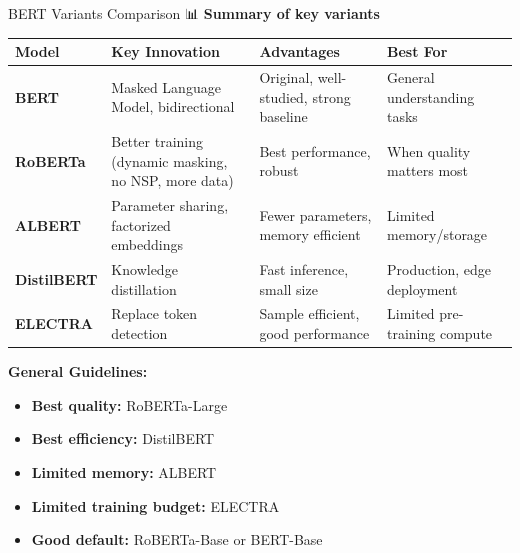 \documentclass[aspectratio=169]{beamer}
\begin{document}
\begin{frame}{BERT Variants Comparison 📊}
\textbf{Summary of key variants}

\vspace{1em}

\begin{center}
\tiny
\begin{tabular}{lp{3cm}p{3cm}p{3cm}}
\toprule
\textbf{Model} & \textbf{Key Innovation} & \textbf{Advantages} & \textbf{Best For} \\
\midrule
\textbf{BERT} &
Masked Language Model, bidirectional &
Original, well-studied, strong baseline &
General understanding tasks \\
\midrule
\textbf{RoBERTa} &
Better training (dynamic masking, no NSP, more data) &
Best performance, robust &
When quality matters most \\
\midrule
\textbf{ALBERT} &
Parameter sharing, factorized embeddings &
Fewer parameters, memory efficient &
Limited memory/storage \\
\midrule
\textbf{DistilBERT} &
Knowledge distillation &
Fast inference, small size &
Production, edge deployment \\
\midrule
\textbf{ELECTRA} &
Replace token detection &
Sample efficient, good performance &
Limited pre-training compute \\
\bottomrule
\end{tabular}
\end{center}

\vspace{1em}

\textbf{General Guidelines:}
\begin{itemize}\setlength{\itemsep}{0pt}
    \item \textbf{Best quality:} RoBERTa-Large
    \item \textbf{Best efficiency:} DistilBERT
    \item \textbf{Limited memory:} ALBERT
    \item \textbf{Limited training budget:} ELECTRA
    \item \textbf{Good default:} RoBERTa-Base or BERT-Base
\end{itemize}
\end{frame}
\end{document}
